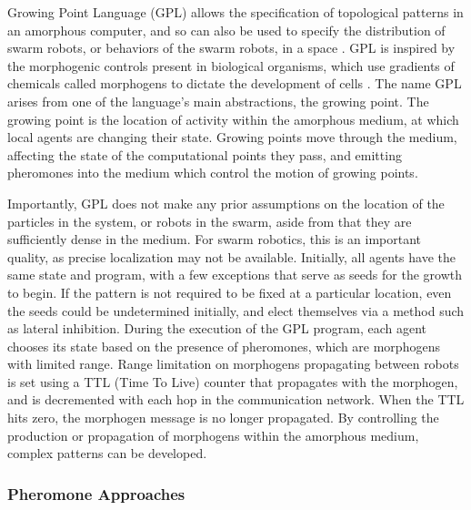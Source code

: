 \documentclass[]{article}
\begin{document}
Growing Point Language (GPL) allows the specification of topological patterns in an amorphous computer, and so can also be used to specify the distribution of swarm robots, or behaviors of the swarm robots, in a space \cite{nagpal2004engineering}. 
GPL is inspired by the morphogenic controls present in biological organisms, which use gradients of chemicals called morphogens to dictate the development of cells \cite{turing1952chemical}.
The name GPL arises from one of the language's main abstractions, the growing point. 
The growing point is the location of activity within the amorphous medium, at which local agents are changing their state. 
Growing points move through the medium, affecting the state of the computational points they pass, and emitting pheromones into the medium which control the motion of growing points.

Importantly, GPL does not make any prior assumptions on the location of the particles in the system, or robots in the swarm, aside from that they are sufficiently dense in the medium. 
For swarm robotics, this is an important quality, as precise localization may not be available. 
Initially, all agents have the same state and program, with a few exceptions that serve as seeds for the growth to begin. 
If the pattern is not required to be fixed at a particular location, even the seeds could be undetermined initially, and elect themselves via a method such as lateral inhibition. 
During the execution of the GPL program, each agent chooses its state based on the presence of pheromones, which are morphogens with limited range. 
Range limitation on morphogens propagating between robots is set using a TTL (Time To Live) counter that propagates with the morphogen, and is decremented with each hop in the communication network. 
When the TTL hits zero, the morphogen message is no longer propagated. 
By controlling the production or propagation of morphogens within the amorphous medium, complex patterns can be developed. 

\subsubsection{Pheromone Approaches}
\end{document}
